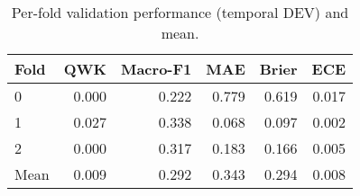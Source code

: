 \begin{table}
\caption{Per-fold validation performance (temporal DEV) and mean.}
\label{tab:cv-performance}
\begin{tabular}{lrrrrr}
\toprule
Fold & QWK & Macro-F1 & MAE & Brier & ECE \\
\midrule
0 & 0.000 & 0.222 & 0.779 & 0.619 & 0.017 \\
1 & 0.027 & 0.338 & 0.068 & 0.097 & 0.002 \\
2 & 0.000 & 0.317 & 0.183 & 0.166 & 0.005 \\
Mean & 0.009 & 0.292 & 0.343 & 0.294 & 0.008 \\
\bottomrule
\end{tabular}
\end{table}
